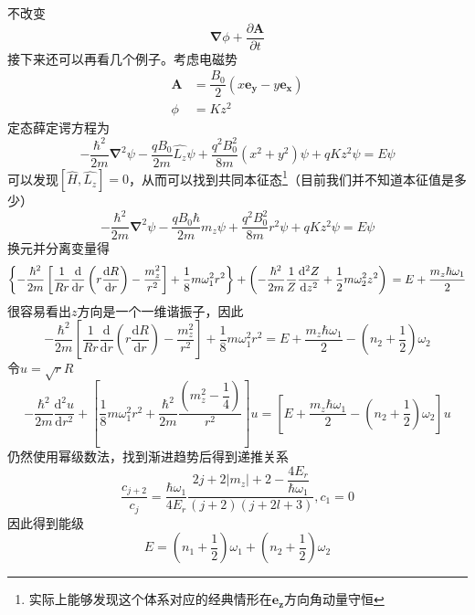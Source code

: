 \documentclass[12pt, a4paper, oneside]{ctexart}
\begin{document}
	\quad\quad 不改变
	\begin{equation}
		\boldsymbol{\nabla}\phi+\dfrac{\partial\boldsymbol{A}}{\partial t}
	\end{equation}
	\quad\quad 接下来还可以再看几个例子。考虑电磁势
	\begin{align}
		\boldsymbol{A}&=\dfrac{B_{0}}{2}\left(x\boldsymbol{e_{y}}-y\boldsymbol{e_{x}}\right)\\
		\phi&=Kz^{2}
	\end{align}
	\quad\quad 定态薛定谔方程为
	\begin{equation}
		-\dfrac{\hbar^{2}}{2m}\boldsymbol{\nabla}^{2}\psi-\dfrac{q B_{0}}{2m}\hat{L_{z}}\psi+\dfrac{q^{2}B_{0}^{2}}{8m}\left(x^{2}+y^{2}\right)\psi+qKz^{2}\psi=E\psi
	\end{equation}
	\quad\quad 可以发现$\left[\hat{H},\hat{L_{z}}\right]=0$，从而可以找到共同本征态\footnote{实际上能够发现这个体系对应的经典情形在$\boldsymbol{e_{z}}$方向角动量守恒}（目前我们并不知道本征值是多少）
	\begin{equation}
		-\dfrac{\hbar^{2}}{2m}\boldsymbol{\nabla}^{2}\psi-\dfrac{q B_{0}\hbar}{2m}m_{z}\psi+\dfrac{q^{2}B_{0}^{2}}{8m}r^{2}\psi+qKz^{2}\psi=E\psi
	\end{equation}
	\quad\quad 换元并分离变量得
	\begin{equation}
		\left\{-\frac{\hbar^{2}}{2 m}\left[\frac{1}{R r} \frac{\mathrm{d}}{\mathrm{d} r}\left(r \frac{\mathrm{d} R}{\mathrm{d} r}\right)-\frac{m_{z}^{2}}{r^{2}}\right]+\frac{1}{8} m \omega_{1}^{2} r^{2}\right\}+\left(-\frac{\hbar^{2}}{2 m} \frac{1}{Z} \frac{\mathrm{d}^{2} Z}{\mathrm{d} z^{2}}+\frac{1}{2} m \omega_{2}^{2} z^{2}\right) \\
		=E+\frac{m_{z} \hbar \omega_{1}}{2}
	\end{equation}
	\quad\quad 很容易看出$z$方向是一个一维谐振子，因此
	\begin{equation}
		-\frac{\hbar^{2}}{2 m}\left[\frac{1}{R r} \frac{\mathrm{d}}{\mathrm{d} r}\left(r \frac{\mathrm{d} R}{\mathrm{d} r}\right)-\frac{m_{z}^{2}}{r^{2}}\right]+\frac{1}{8} m \omega_{1}^{2} r^{2}=E+\dfrac{m_{z}\hbar\omega_{1}}{2}-\left(n_{2}+\dfrac{1}{2}\right)\omega_{2}
	\end{equation}
	\quad\quad 令$u=\sqrt{r}R$
	\begin{equation}
		-\dfrac{\hbar^{2}}{2m}\dfrac{\mathrm{d}^{2}u}{\mathrm{d}r^{2}}+\left[\dfrac{1}{8}m\omega_{1}^{2}r^{2}+\dfrac{\hbar^{2}}{2m}\dfrac{\left(m_{z}^{2}-\dfrac{1}{4}\right)}{r^{2}}\right]u=\left[E+\dfrac{m_{z}\hbar\omega_{1}}{2}-\left(n_{2}+\dfrac{1}{2}\right)\omega_{2}\right]u
	\end{equation}
	\quad\quad 仍然使用幂级数法，找到渐进趋势后得到递推关系
	\begin{equation}
		\dfrac{c_{j+2}}{c_{j}}=\dfrac{\hbar\omega_{1}}{4E_{r}}\dfrac{2j+2\left|m_{z}\right|+2-\dfrac{4E_{r}}{\hbar\omega_{1}}}{\left(j+2\right)\left(j+2l+3\right)},c_{1}=0
	\end{equation}
	\quad\quad 因此得到能级
	\begin{equation}
		E=\left(n_{1}+\dfrac{1}{2}\right)\omega_{1}+\left(n_{2}+\dfrac{1}{2}\right)\omega_{2}
	\end{equation}
\end{document}
